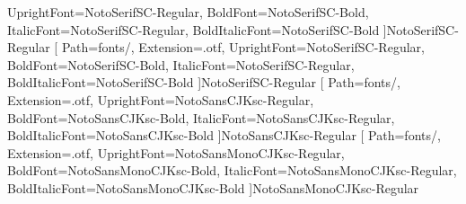   UprightFont=NotoSerifSC-Regular,
  BoldFont=NotoSerifSC-Bold,
  ItalicFont=NotoSerifSC-Regular,
  BoldItalicFont=NotoSerifSC-Bold
]{NotoSerifSC-Regular}
[
  Path=fonts/,
  Extension=.otf,
  UprightFont=NotoSerifSC-Regular,
  BoldFont=NotoSerifSC-Bold,
  ItalicFont=NotoSerifSC-Regular,
  BoldItalicFont=NotoSerifSC-Bold
]{NotoSerifSC-Regular}
[
  Path=fonts/,
  Extension=.otf,
  UprightFont=NotoSansCJKsc-Regular,
  BoldFont=NotoSansCJKsc-Bold,
  ItalicFont=NotoSansCJKsc-Regular,
  BoldItalicFont=NotoSansCJKsc-Bold
]{NotoSansCJKsc-Regular}
[
  Path=fonts/,
  Extension=.otf,
  UprightFont=NotoSansMonoCJKsc-Regular,
  BoldFont=NotoSansMonoCJKsc-Bold,
  ItalicFont=NotoSansMonoCJKsc-Regular,
  BoldItalicFont=NotoSansMonoCJKsc-Bold
]{NotoSansMonoCJKsc-Regular}

\renewcommand{\CJKrmdefault}{zhsong}
\renewcommand{\CJKsfdefault}{zhhei}
\renewcommand{\CJKttdefault}{zhmono}
\providecommand{\songti}{}
\renewcommand{\songti}{\CJKfamily{zhsong}}
\providecommand{\heiti}{}
\renewcommand{\heiti}{\CJKfamily{zhhei}}
\providecommand{\fangsong}{}
\renewcommand{\fangsong}{\CJKfamily{zhfs}}
\providecommand{\kaishu}{}
\renewcommand{\kaishu}{\CJKfamily{zhkai}}
\providecommand{\lishu}{}
\renewcommand{\lishu}{\CJKfamily{zhli}}
\providecommand{\youyuan}{}
\renewcommand{\youyuan}{\CJKfamily{zhyou}}

\newfontfamily{}


